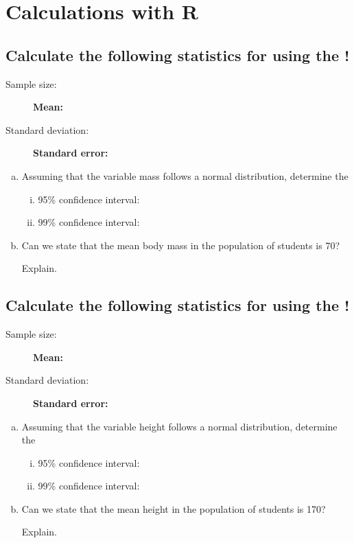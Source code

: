 \clearpage

\section{Calculations with R}

\subsection{Calculate the following statistics for  using the \quest!}

\begin{description}
\item[Sample size: ] \hrulefill \quad \textbf{Mean:} \hrulefill
\item[Standard deviation: ] \hrulefill \quad \textbf{Standard error:} \hrulefill
\end{description}

\begin{enumerate}[a)]
\item Assuming that the variable mass follows a normal distribution, determine the 
	\begin{enumerate}[i)]
	\item 95\% confidence interval: \hrulefill
	\item 99\% confidence interval: \hrulefill 	
	\end{enumerate}
\item Can we state that the mean body mass in the population of students is 70? 	

  \hrulefill	

	Explain. \hrulefill
\end{enumerate}


\subsection{Calculate the following statistics for  using the \quest!}

\begin{description}
\item[Sample size: ] \hrulefill \quad \textbf{Mean:} \hrulefill
\item[Standard deviation: ] \hrulefill \quad \textbf{Standard error:} \hrulefill
\end{description}

\begin{enumerate}[a)]
\item Assuming that the variable height follows a normal distribution, determine the 
	\begin{enumerate}[i)]
	\item 95\% confidence interval: \hrulefill
	\item 99\% confidence interval: \hrulefill 	
	\end{enumerate}
\item Can we state that the mean height in the population of students is 170? 	

  \hrulefill	

	Explain. \hrulefill
\end{enumerate}

